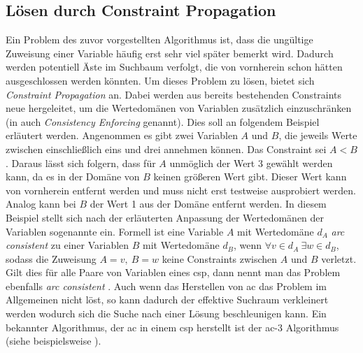 \subsection{Lösen durch Constraint Propagation}
Ein Problem des zuvor vorgestellten Algorithmus ist, dass die ungültige Zuweisung einer Variable häufig erst sehr viel später bemerkt wird. Dadurch werden potentiell Äste im
Suchbaum verfolgt, die von vornherein schon hätten ausgeschlossen werden könnten. Um dieses Problem zu lösen, bietet sich \textit{Constraint Propagation} an. Dabei werden
aus bereits bestehenden Constraints neue hergeleitet, um die Wertedomänen von Variablen zusätzlich einzuschränken (in \cite{OrderingHeuristics} auch \textit{Consistency
Enforcing} genannt). Dies soll an folgendem Beispiel erläutert werden. Angenommen es gibt zwei Variablen $A$ und $B$, die jeweils Werte zwischen einschließlich eins und drei
annehmen können. Das Constraint sei $A < B$. Daraus lässt sich folgern, dass für $A$ unmöglich der Wert 3 gewählt werden kann, da es in der Domäne von $B$ keinen größeren
Wert gibt. Dieser Wert kann von vornherein entfernt werden und muss nicht erst testweise ausprobiert werden. Analog kann bei $B$ der Wert 1 aus der Domäne entfernt werden. In
diesem Beispiel stellt sich nach der erläuterten Anpassung der Wertedomänen der Variablen sogenannte  ein. Formell ist eine Variable $A$ mit Wertedomäne $d_A$ \textit{arc
consistent} zu einer Variablen $B$ mit Wertedomäne $d_B$, wenn $\forall v \in d_A \ \exists w \in d_B$, sodass die Zuweisung $A = v, \ B = w$ keine Constraints zwischen $A$ und
$B$ verletzt. Gilt dies für alle Paare von Variablen eines \ac*{csp}, dann nennt man das Problem ebenfalls \textit{arc consistent} \cite{ACOverview}. Auch wenn das Herstellen von
\ac*{ac} das Problem im Allgemeinen nicht löst, so kann dadurch der effektive Suchraum verkleinert werden wodurch sich die Suche nach einer Lösung beschleunigen kann. Ein bekannter
Algorithmus, der \ac*{ac} in einem \ac*{csp} herstellt ist der \ac*{ac}-3 Algorithmus (siehe beispielsweise \cite{ac3}).
